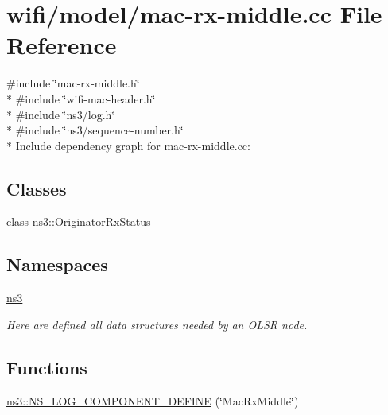 \hypertarget{mac-rx-middle_8cc}{}\section{wifi/model/mac-\/rx-\/middle.cc File Reference}
\label{mac-rx-middle_8cc}
{\ttfamily \#include \char`\"{}mac-\/rx-\/middle.\+h\char`\"{}}\\*
{\ttfamily \#include \char`\"{}wifi-\/mac-\/header.\+h\char`\"{}}\\*
{\ttfamily \#include \char`\"{}ns3/log.\+h\char`\"{}}\\*
{\ttfamily \#include \char`\"{}ns3/sequence-\/number.\+h\char`\"{}}\\*
Include dependency graph for mac-\/rx-\/middle.cc\+:
\subsection*{Classes}
\begin{DoxyCompactItemize}
\item 
class \hyperlink{classns3_1_1OriginatorRxStatus}{ns3\+::\+Originator\+Rx\+Status}
\end{DoxyCompactItemize}
\subsection*{Namespaces}
\begin{DoxyCompactItemize}
\item 
 \hyperlink{namespacens3}{ns3}
\begin{DoxyCompactList}\small\item\em Here are defined all data structures needed by an O\+L\+SR node. \end{DoxyCompactList}\end{DoxyCompactItemize}
\subsection*{Functions}
\begin{DoxyCompactItemize}
\item 
\hyperlink{namespacens3_aad696e02811451b45a4794b2ee62bf66}{ns3\+::\+N\+S\+\_\+\+L\+O\+G\+\_\+\+C\+O\+M\+P\+O\+N\+E\+N\+T\+\_\+\+D\+E\+F\+I\+NE} (\char`\"{}Mac\+Rx\+Middle\char`\"{})
\end{DoxyCompactItemize}
